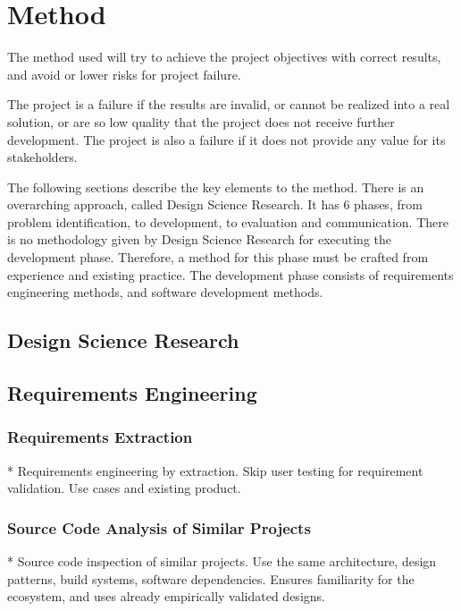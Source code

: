 \chapter{Method}\label{chap:method}

The method used will try to achieve the project objectives with correct results, and avoid or lower risks for project failure.


The project is a failure if the results are invalid, or cannot be realized into a real solution, or are so low quality that the project does not receive further development.
The project is also a failure if it does not provide any value for its stakeholders.


The following sections describe the key elements to the method.
There is an overarching approach, called Design Science Research.
It has 6 phases, from problem identification, to development, to evaluation and communication.
There is no methodology given by Design Science Research for executing the development phase.
Therefore, a method for this phase must be crafted from experience and existing practice.
The development phase consists of requirements engineering methods, and software development methods.


\section{Design Science Research}




\section{Requirements Engineering}

\subsection{Requirements Extraction}

* Requirements engineering by extraction. Skip user testing for requirement validation. Use cases and existing product.

\subsection{Source Code Analysis of Similar Projects}
* Source code inspection of similar projects. Use the same architecture, design patterns, build systems, software dependencies. Ensures familiarity for the ecosystem, and uses already empirically validated designs.

